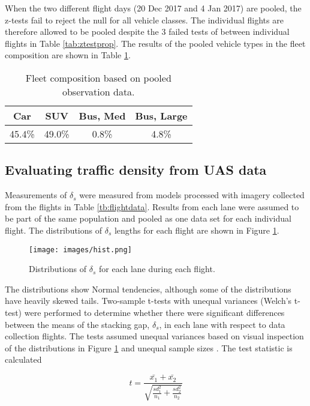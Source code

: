 When the two different flight days (20 Dec 2017 and 4 Jan 2017) are pooled, the z-tests fail to reject the null for all vehicle classes.  The individual flights are therefore allowed to be pooled despite the 3 failed tests of between individual flights in Table \ref{tab:ztestprop}. The results of the pooled vehicle types in the fleet composition are shown in Table \ref{tab:pooledfleet}.

\begin{table}[H]
\centering
\caption{Fleet composition based on pooled observation data.}
\label{tab:pooledfleet}
\begin{tabular}{cccc}
\toprule
\textbf{Car} & \textbf{SUV} & \textbf{Bus, Med} & \textbf{Bus, Large} \\ \midrule
45.4\% & 49.0\% & 0.8\% & 4.8\%\\ \bottomrule
\end{tabular}
\end{table}

\subsection{Evaluating traffic density from UAS data}

Measurements of $\delta_{s}$ were measured from models processed with imagery collected from the flights in Table \ref{tb:flightdata}.  Results from each lane were assumed to be part of the same population and pooled as one data set for each individual flight. The distributions of  $\delta_{s}$ lengths for each flight are shown in Figure \ref{fig:hist}.

\begin{figure}[H]
\centering
\texttt{[image: images/hist.png]} 
\caption{Distributions of $\delta_{s}$ for each lane during each flight.}
\label{fig:hist}
\end{figure}

The distributions show Normal tendencies, although some of the distributions have heavily skewed tails. Two-sample t-tests with unequal variances (Welch's t-test) were performed to determine whether there were significant differences between the means of the stacking gap, $\delta_{s}$, in each lane with respect to data collection flights. The tests assumed unequal variances based on visual inspection of the distributions in Figure \ref{fig:hist} and unequal sample sizes \citep{Rasch2011, Derrick2016}. The test statistic is calculated 

\begin{equation}
t = \frac{\bar{x_{1}}+\bar{x_{2}}}{\sqrt{\frac{sd^{2}_{1}}{n_{1}} + \frac{sd^{2}_{2}}{n_{2}} }}
\end{equation}

